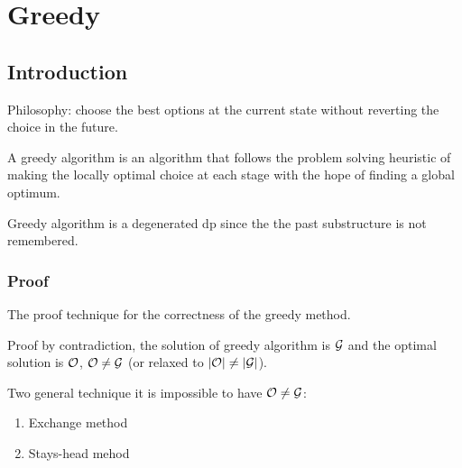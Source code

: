 \chapter{Greedy}

\section{Introduction}
Philosophy: choose the best options at the current state without reverting the choice in the future. 

A greedy algorithm is an algorithm that follows the problem solving heuristic of making the locally optimal choice at each stage with the hope of finding a global optimum.

Greedy algorithm is a degenerated dp since the the past substructure is not remembered.

\subsection{Proof}
The proof technique for the correctness of the greedy method. 

Proof by contradiction, the solution of greedy algorithm is $\mathcal{G}$ and the optimal solution is $\mathcal{O}$, $\mathcal{O}\neq \mathcal{G}$ (or relaxed to $|\mathcal{O}|\neq |\mathcal{G}|$). 

Two general technique it is impossible to have $\mathcal{O}\neq \mathcal{G}$:
\begin{enumerate}
\item Exchange method 
\item Stays-head mehod 
\end{enumerate}
 
